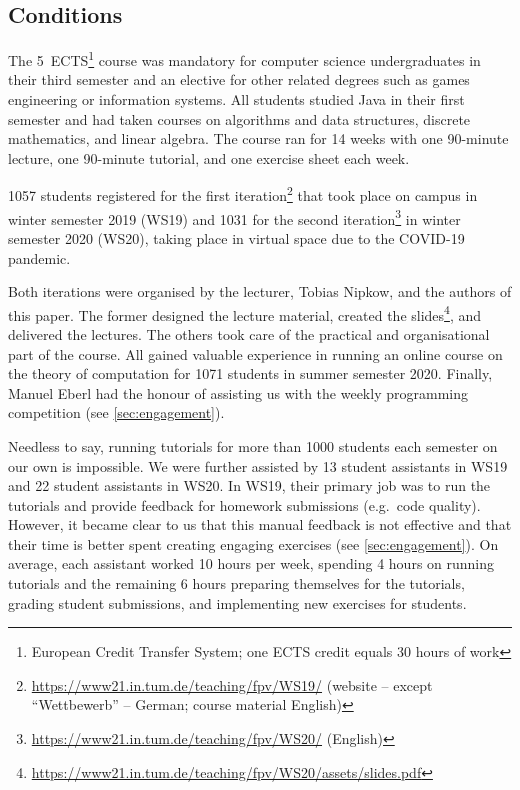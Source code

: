 \subsection{Conditions}

The 5~ECTS\footnote{European Credit Transfer System; one ECTS credit equals 30 hours of work} course was mandatory for computer science undergraduates in their third semester and
an elective for other related degrees such as games engineering or information systems.
All students studied Java in their first semester and had taken courses on algorithms and data structures,
discrete mathematics, and linear algebra.
The course ran for 14 weeks with
one 90-minute lecture,
one 90-minute tutorial,
and one exercise sheet each week.

1057 students registered for
the first iteration\footnote{\url{https://www21.in.tum.de/teaching/fpv/WS19/} (website -- except ``Wettbewerb'' -- German; course material English)} that took place on campus in winter semester 2019 (WS19) and
1031 for the second iteration\footnote{\url{https://www21.in.tum.de/teaching/fpv/WS20/} (English)} in winter semester 2020 (WS20), taking place in virtual space due to the COVID-19 pandemic.

Both iterations were organised by the lecturer, Tobias Nipkow, and the authors of this paper.
The former designed the lecture material, created the slides\footnote{\url{https://www21.in.tum.de/teaching/fpv/WS20/assets/slides.pdf}}, and delivered the lectures.
The others took care of the practical and organisational part of the course.
All gained valuable experience in running an online course on the theory of computation for 1071
students in summer semester 2020.
Finally, Manuel Eberl had the honour of assisting us with the weekly programming competition (see \cref{sec:engagement}).

Needless to say,
running tutorials for more than 1000
students each semester on our own is impossible.
We were further assisted by
13 student assistants in WS19 and
22 student assistants in WS20.
In WS19, their primary job was to run the tutorials and provide feedback for homework submissions (e.g.\ code quality).
However, it became clear to us
that this manual feedback is not effective
and that their time is better spent creating engaging exercises (see \cref{sec:engagement}).
On average, each assistant worked 10 hours per week,
spending 4 hours on running tutorials
and the remaining 6 hours
preparing themselves for the tutorials,
grading student submissions,
and implementing new exercises for students.

